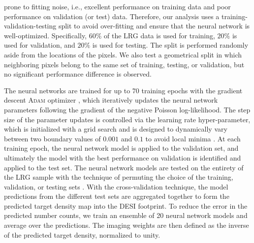  prone to fitting noise, i.e., excellent performance on training data and poor performance on validation (or test) data. Therefore, our analysis uses a training-validation-testing split to avoid over-fitting and ensure that the neural network is well-optimized. Specifically, $60\%$ of the LRG data is used for training, $20\%$ is used for validation, and $20\%$ is used for testing. The split is performed randomly aside from the locations of the pixels. We also test a geometrical split in which neighboring pixels belong to the same set of training, testing, or validation, but no significant performance difference is observed.

The neural networks are trained for up to 70 training epochs with the gradient descent \textsc{Adam} optimizer \citep{2017arXiv171105101L}, which iteratively updates the neural network parameters following the gradient of the negative Poisson log-likelihood. The step size of the parameter updates is controlled via the learning rate hyper-parameter, which is initialized with a grid search and is designed to dynamically vary between two boundary values of $0.001$ and $0.1$ to avoid local minima \citep[see, also,][]{2016arXiv160803983L}. At each training epoch, the neural network model is applied to the validation set, and ultimately the model with the best performance on validation is identified and applied to the test set. The neural network models are tested on the entirety of the LRG sample with the technique of permuting the choice of the training, validation, or testing sets \citep{arlot2010survey}. With the cross-validation technique, the model predictions from the different test sets are aggregated together to form the predicted target density map into the DESI footprint. To reduce the error in the predicted number counts, we train an ensemble of 20 neural network models and average over the predictions. The imaging weights are then defined as the inverse of the predicted target density, normalized to unity.

